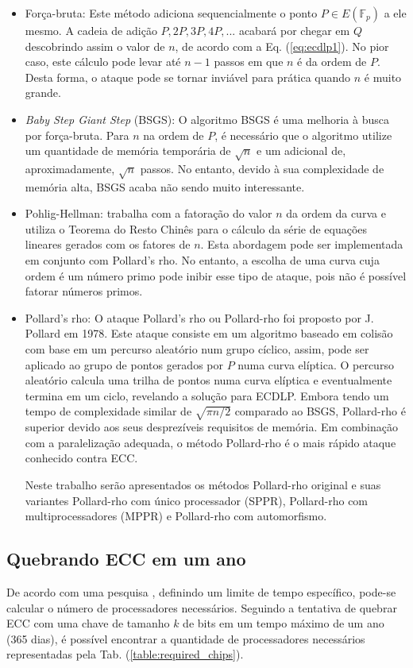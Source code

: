 \begin{itemize}
\item Força-bruta: Este método adiciona sequencialmente o ponto $P \in E(\mathbb{F}_p)$ a ele mesmo. A cadeia de adição $P, 2P, 3P, 4P, ...$ acabará por chegar em \(Q\) descobrindo assim o valor de \(n\), de acordo com a Eq. (\ref{eq:ecdlp1}). No pior caso, este cálculo pode levar até $n - 1$ passos em que \(n\) é da ordem de \(P\). Desta forma, o ataque pode se tornar inviável para prática quando \(n\) é muito grande.
\item \textit{Baby Step Giant Step} (BSGS): O algoritmo BSGS é uma melhoria à busca por força-bruta. Para \(n\) na ordem de \(P\), é necessário que o algoritmo utilize um quantidade de memória temporária de $\sqrt{n}$ e um adicional de, aproximadamente, $\sqrt{n}$ passos. No entanto, devido à sua complexidade de memória alta, BSGS acaba não sendo muito interessante.
\item Pohlig-Hellman: trabalha com a fatoração do valor \(n\) da ordem da curva e utiliza o Teorema do Resto Chinês para o cálculo da série de equações lineares gerados com os fatores de \(n\). Esta abordagem pode ser implementada em conjunto com Pollard's rho. No entanto, a escolha de uma curva cuja ordem é um número primo pode inibir esse tipo de ataque, pois não é possível fatorar números primos.
\item Pollard's rho: O ataque Pollard's rho ou Pollard-rho foi proposto por J. Pollard em 1978. Este ataque consiste em um algoritmo baseado em colisão com base em um percurso aleatório num grupo cíclico, assim, pode ser aplicado ao grupo de pontos gerados por \(P\) numa curva elíptica. O percurso aleatório calcula uma trilha de pontos numa curva elíptica e eventualmente termina em um ciclo, revelando a solução para ECDLP. \cite{Pollard:1978} Embora tendo um tempo de complexidade similar de $\sqrt{\pi n/2}$ comparado ao BSGS, Pollard-rho é superior devido aos seus desprezíveis requisitos de memória. Em combinação com a paralelização adequada, o método Pollard-rho é o mais rápido ataque conhecido contra ECC. \cite{Pelzl:2006}

Neste trabalho serão apresentados os métodos Pollard-rho original e suas variantes Pollard-rho com único processador (SPPR), Pollard-rho com multiprocessadores (MPPR) e Pollard-rho com automorfismo.
\end{itemize}

%
%
\subsection{Quebrando ECC em um ano}
\label{quebrando_ecc_um_ano}
De acordo com uma pesquisa \cite{Pelzl:2006}, definindo um limite de tempo específico, pode-se calcular o número de processadores necessários. Seguindo a tentativa de quebrar ECC com uma chave de tamanho \(k\) de bits em um tempo máximo de um ano (365 dias), é possível encontrar a quantidade de processadores necessários representadas pela Tab. (\ref{table:required_chips}).

